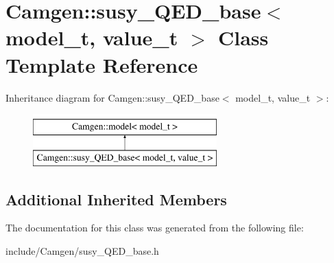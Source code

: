 \hypertarget{a00531}{}\section{Camgen\+:\+:susy\+\_\+\+Q\+E\+D\+\_\+base$<$ model\+\_\+t, value\+\_\+t $>$ Class Template Reference}
\label{a00531}
Inheritance diagram for Camgen\+:\+:susy\+\_\+\+Q\+E\+D\+\_\+base$<$ model\+\_\+t, value\+\_\+t $>$\+:\begin{figure}[H]
\begin{center}
\leavevmode
\includegraphics[height=2.000000cm]{a00531}
\end{center}
\end{figure}
\subsection*{Additional Inherited Members}


The documentation for this class was generated from the following file\+:\begin{DoxyCompactItemize}
\item 
include/\+Camgen/susy\+\_\+\+Q\+E\+D\+\_\+base.\+h\end{DoxyCompactItemize}
